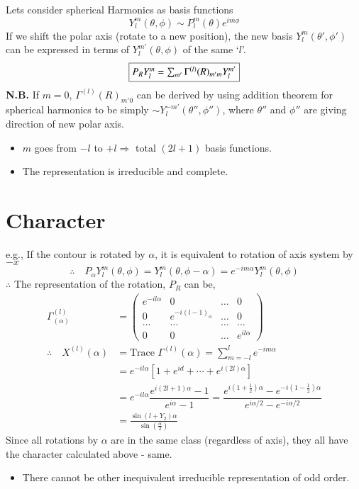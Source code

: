 Lets consider spherical Harmonics as basis functions
$$
Y^{m}_{l}(\theta,\phi)\sim P^{m}_{l}(\theta)e^{im\phi}
$$
If we shift the polar axis (rotate to a new position), the new basis $Y^{m}_{l}(\theta',\phi')$ can be expressed in terms of $Y_{l}^{m'}(\theta,\phi)$ of the same `$l$'.
$$
\fbox{$P_{R}Y^{m}_{l}=\sum_{m'}\Gamma^{(l)}(R)_{m'm}Y^{m'}_{l}$}
$$
{\bf N.B.} If $m=0$, $\Gamma^{(l)}(R)_{m'0}$ can be derived by using addition theorem for spherical harmonics to be simply $\sim Y^{-m'}_{l}(\theta'',\phi'')$, where $\theta''$ and $\phi''$ are giving direction of new polar axis.
\begin{itemize}
\item $m$ goes from $-l$ to $+l\Rightarrow$ total $(2l+1)$ basis functions.

\item The representation is irreducible and complete.
\end{itemize}

\section*{Character}

e.g., If the contour is rotated by $\alpha$, it is equivalent to rotation of axis system by $-x$
$$
\therefore\quad P_{\alpha}Y^{m}_{l}(\theta,\phi)=Y^{m}_{l}(\theta,\phi-\alpha)=e^{-im\alpha}Y^{m}_{l}(\theta,\phi)
$$
$\therefore$ The representation of the rotation, $P_{R}$ can be, 
\begin{align*}
\Gamma^{(l)}_{(\alpha)}&=
\left(
\begin{matrix}
e^{-il\alpha} & 0 & \ldots & 0\\
0 & e^{-i(l-1)_{\alpha}} & \ldots & 0\\
\ldots & \ldots & \ldots & \ldots\\
0 & 0 & \ldots & e^{il\alpha}
\end{matrix}
\right)\\
\therefore\quad X^{(l)}(\alpha) &= \text{Trace } \Gamma^{(l)}(\alpha)=\sum\limits^{l}_{m=-l}e^{-im\alpha}\\
&= e^{-il\alpha}\left[1+e^{id}+\cdots+e^{i(2l)\alpha}\right]\\
&= e^{-il\alpha}\dfrac{e^{i(2l+1)\alpha}-1}{e^{i\alpha}-1}=\dfrac{e^{i(1+\frac{1}{2})\alpha}-e^{-i(1-\frac{1}{2})\alpha}}{e^{i\alpha/2}-e^{-i\alpha/2}}\\
&= \frac{\sin (l+Y_{2})\alpha}{\sin(\frac{\alpha}{2})}
\end{align*}
Since all rotations by $\alpha$ are in the same class (regardless of axis), they all have the character calculated above - same.
\begin{itemize}
\item There cannot be other inequivalent irreducible representation of odd order.
\end{itemize}

